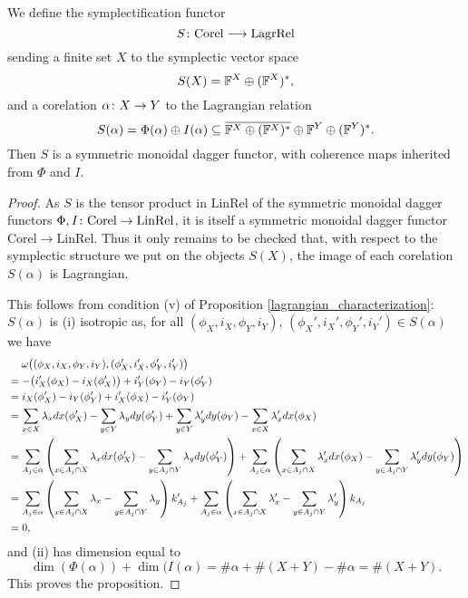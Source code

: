 \begin{proposition} \label{prop:sympfunctor}
  We define the symplectification functor
  \[
    S{\colon} \mathrm{Corel} \longrightarrow \mathrm{LagrRel}
  \]
  sending a finite set $X$ to the symplectic vector space
\[
  S(X) = {\mathbb F}^X \oplus ({\mathbb F}^X)^\ast,
\]
 and a corelation $\alpha{\colon} X \to Y$ to the Lagrangian relation
\[
  S(\alpha) = \Phi(\alpha) \oplus I(\alpha) \subseteq \overline{{\mathbb F}^X \oplus
  ({\mathbb F}^X)^\ast}\oplus {\mathbb F}^Y \oplus ({\mathbb F}^Y)^\ast.
\]
  Then $S$ is a symmetric monoidal dagger functor, with coherence maps inherited
  from $\Phi$ and $I$.
\end{proposition}
\begin{proof}
  As $S$ is the tensor product in $\mathrm{LinRel}$ of the symmetric monoidal
  dagger functors $\Phi, I{\colon} \mathrm{Corel} \to \mathrm{LinRel}$, it is
  itself a symmetric monoidal dagger functor $\mathrm{Corel} \to
  \mathrm{LinRel}$. Thus it only remains to be checked that, with respect to the
  symplectic structure we put on the objects $S(X)$, the image of each
  corelation $S(\alpha)$ is Lagrangian. 

  This follows from condition (v) of Proposition
  \ref{lagrangian_characterization}: $S(\alpha)$ is (i) isotropic as, for all 
  $(\phi_X,i_X,\phi_Y,i_Y)$, $(\phi_X',i_X',\phi_Y',i_Y') \in S(\alpha)$ we have
  \begin{align*}
    &\phantom{=} \enskip
    \omega\big((\phi_X,i_X,\phi_Y,i_Y),(\phi_X',i_X',\phi_Y',i_Y')\big)
    \\
    &= -\big(i_X'(\phi_X)-i_X(\phi_X')\big) + i_Y'(\phi_Y)-i_Y(\phi_Y') \\
    &= i_X(\phi_X')-i_Y(\phi_Y') + i_X'(\phi_X)-i_Y'(\phi_Y) \\
    &= \sum_{x \in X} \lambda_x dx(\phi_X') - \sum_{y \in Y} \lambda_y dy(\phi_Y') +
    \sum_{y \in Y} \lambda_y' dy(\phi_Y) - \sum_{x \in X} \lambda_x' dx(\phi_X)\\
    &= \sum_{A_j \in \alpha}\left(\sum_{x \in A_j \cap X} \lambda_x dx(\phi_X') -
    \sum_{y \in A_j \cap Y} \lambda_y dy(\phi_Y')\right)+ \sum_{A_j \in
    \alpha}\left(\sum_{x \in A_j \cap X} \lambda_x'dx(\phi_X) - \sum_{y \in A_j
    \cap Y} \lambda_y' dy(\phi_Y)\right)\\
    &= \sum_{A_j \in \alpha}\left(\sum_{x \in A_j \cap X} \lambda_x - \sum_{y \in
    A_j \cap Y} \lambda_y \right)k'_{A_j} + \sum_{A_j \in \alpha}\left(\sum_{x \in
    A_j \cap X} \lambda_x'- \sum_{y \in A_j \cap Y} \lambda_y'\right)k_{A_j}\\
    &= 0,
  \end{align*}
  and (ii) has dimension equal to 
  \[
    \dim(\Phi(\alpha))+ \dim(I(\alpha) = \#\alpha+\#(X+Y) - \#\alpha= \#(X+Y).
  \]
  This proves the proposition.
\end{proof}

